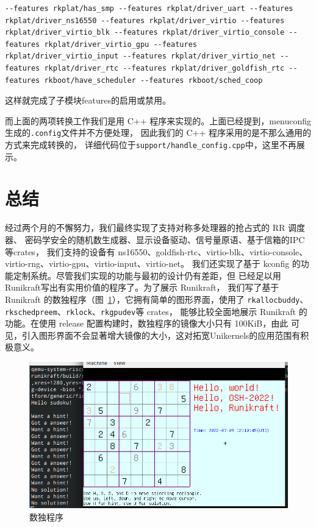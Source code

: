 \documentclass{../runikraft-report}
\begin{document}
\begin{lstlisting}
--features rkplat/has_smp --features rkplat/driver_uart --features rkplat/driver_ns16550 --features rkplat/driver_virtio --features rkplat/driver_virtio_blk --features rkplat/driver_virtio_console --features rkplat/driver_virtio_gpu --features rkplat/driver_virtio_input --features rkplat/driver_virtio_net --features rkplat/driver_rtc --features rkplat/driver_goldfish_rtc --features rkboot/have_scheduler --features rkboot/sched_coop
\end{lstlisting}

这样就完成了子模块features的启用或禁用。

而上面的两项转换工作我们是用 C++ 程序来实现的。上面已经提到，menuconfig生成的\texttt{.config}文件并不方便处理，
因此我们的 C++ 程序采用的是不那么通用的方式来完成转换的，
详细代码位于\texttt{support/handle\_config.cpp}中，这里不再展示。

\section{总结}
经过两个月的不懈努力，我们最终实现了支持对称多处理器的抢占式的 RR 调度器、
密码学安全的随机数生成器、显示设备驱动、信号量原语、基于信箱的IPC等crates，
我们支持的设备有 ns16550、goldfish-rtc、virtio-blk、virtio-console、
virtio-rng、virtio-gpu、virtio-input、virtio-net。
我们还实现了基于 kconfig 的功能定制系统。尽管我们实现的功能与最初的设计仍有差距，但
已经足以用Runikraft写出有实用价值的程序了。为了展示 Runikraft，
我们写了基于 Runikraft 的数独程序（图\ \ref{fig:sudoku}），它拥有简单的图形界面，使用了 \texttt{rkallocbuddy}、\texttt{rkschedpreem}、\texttt{rklock}、\texttt{rkgpudev}等 crates，
能够比较全面地展示 Runikraft 的功能。在使用 release 配置构建时，数独程序的镜像大小只有 100KiB，由此
可见，引入图形界面不会显著增大镜像的大小，这对拓宽Unikernels的应用范围有积极意义。

\begin{figure}[tbh!]
\centering
\includegraphics[width=0.6\linewidth]{assets/sudoku}
\caption{数独程序}
\label{fig:sudoku}
\end{figure}
\end{document}
